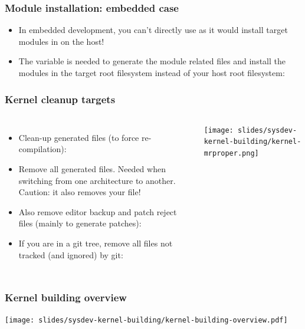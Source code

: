\begin{frame}
  \frametitle{Module installation: embedded case}
  \begin{itemize}
  \item In embedded development, you can't directly use
     as it would install target modules
    in  on the host!
  \item The  variable is needed to generate
    the module related files and install the modules in the target
    root filesystem instead of your host root filesystem:\\
  \end{itemize}
\end{frame}

\begin{frame}
  \frametitle{Kernel cleanup targets}
  \begin{columns}
    \begin{itemize}
    \item Clean-up generated files (to force re-compilation):\\
    \item Remove all generated files. Needed when switching from one
      architecture to another. Caution: it also removes your  file!\\
    \item Also remove editor backup and patch reject files (mainly to
      generate patches):\\
    \item If you are in a git tree, remove all files not tracked (and
      ignored) by git:\\
    \end{itemize}
    \texttt{[image: slides/sysdev-kernel-building/kernel-mrproper.png]}
  \end{columns}
\end{frame}

\begin{frame}
  \frametitle{Kernel building overview}
  \begin{center}
    \texttt{[image: slides/sysdev-kernel-building/kernel-building-overview.pdf]}
  \end{center}
\end{frame}

